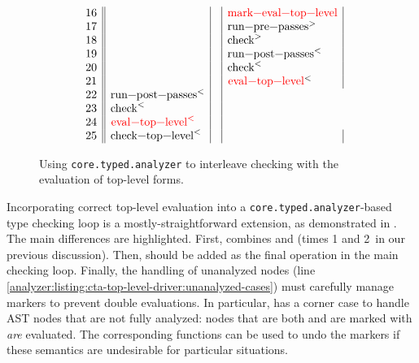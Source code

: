 \begin{figure*}
$$\begin{array}{r||l|l|l|l|}
     16      &                                                    & & \textcolor{red}{\text{\clj{mark-eval-top-level}}}          \\
     17      &                                                    & & \text{\clj{run-pre-passes}}^{>}                              \\
     18      &                                                    & & \text{\clj{check}}^{>}                                       \\
     19      &                                                    & & \text{\clj{run-post-passes}}^{<}                             \\
     20      &                                                    & & \text{\clj{check}}^{<}                                       \\
     21      &                                                    & & \textcolor{red}{\text{\clj{eval-top-level}}}^{<}             \\
     22      & \text{\clj{run-post-passes}}^{<}                   & \\
     23      & \text{\clj{check}}^{<}                             & \\
     24      & \textcolor{red}{\text{\clj{eval-top-level}}^{<}}   & \\
     25      & \text{\clj{check-top-level}}^{<}                   & &                     \\
  \end{array}
$$
  \caption{Using \texttt{core.typed.analyzer}
  to interleave checking with the evaluation of
  top-level forms.}
  \label{fig:analyzer:control-flow-incremental-side-effects}
\end{figure*}

Incorporating correct top-level evaluation into a \texttt{core.typed.analyzer}-based
type checking loop is a mostly-straightforward extension, as demonstrated in
  .
The main differences are highlighted.
First,  combines
and
 (times 1 and 2\ in our previous discussion).
Then,  should be added as the final operation in
the main checking loop.
%
Finally,
the handling of unanalyzed nodes 
(line \ref{analyzer:listing:cta-top-level-driver:unanalyzed-cases})
must carefully manage markers to prevent double evaluations.
In particular, 
has a corner case to handle AST nodes that are not fully analyzed:
nodes that are both  and 
are marked with  \emph{are} evaluated.
The corresponding functions 
 can be used
to undo the markers if these semantics are undesirable for particular
situations.

